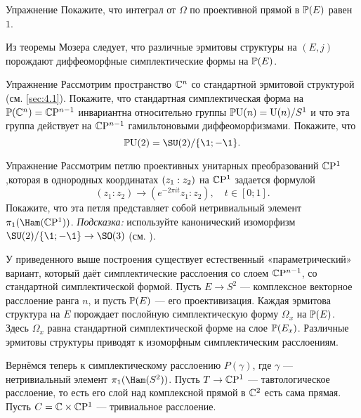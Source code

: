 \begin{ex}{Упражнение}\label{9.2.A}
  Покажите, что интеграл от $\Omega$ по проективной прямой в $\mathbb{P}(E)$
  равен $1$.
\end{ex}

Из теоремы Мозера \cite{MS} следует, что различные эрмитовы структуры
на $(E, j)$ порождают диффеоморфные симплектические формы на
$\mathbb{P}(E)$. 

\begin{ex}{Упражнение}\label{9.2.B}
  Рассмотрим пространство $\mathbb{C}^n$ со стандартной эрмитовой структурой
  (см. \ref{sec:4.1}).
  Покажите, что стандартная симплектическая форма на $\mathbb{P}(\mathbb{C}^n ) =
  \mathbb{C}\mathrm{P}^{n-1}$ инвариантна относительно группы $\mathbb{P}\mathrm{U} (n) = \mathrm{U} (n)/S^1$ и
  что эта группа действует на $\mathbb{C}\mathrm{P}^{n-1}$ гамильтоновыми
  диффеоморфизмами.
  Покажите, что 
  \[\PU (2) = \SU (2)/\{\1; -\1\}.\]
\end{ex}
 
\begin{ex}{Упражнение}\label{9.2.C}
Рассмотрим петлю проективных унитарных преобразований $\mathbb{C}\mathrm{P}^1$,которая в однородных координатах $(z_1 \z: z_2)$ на $\mathbb{C}\mathrm{P}^1$ задается формулой
\[(z_1 : z_2 ) \to (e^{-2\pi it} z_1 : z_2 ),\quad t \in [0; 1].\]
Покажите, что эта петля представляет собой нетривиальный элемент $\pi_1 (\Ham(\CP^1 ))$.
\emph{Подсказка:} используйте канонический изоморфизм $\SU (2)/\{\1; -\1\}\to \SO(3)$ (см. \cite{DFN}).  
\end{ex}

У приведенного выше построения существует естественный
«параметрический» вариант, который даёт симплектические расслоения со
слоем $\mathbb{C}\mathrm{P}^{n-1}$, со стандартной симплектической формой. 
Пусть $E \to S^2$ --- комплексное векторное расслоение ранга $n$, и
пусть $\mathbb{P}(E)$ --- его проективизация. 
Каждая эрмитова структура на $E$ порождает послойную симплектическую
форму $\Omega_x$ на $\mathbb{P}(E)$. 
Здесь $\Omega_x$ равна стандартной симплектической форме на слое
$\mathbb{P}(E_x)$.
Различные эрмитовы структуры приводят к изоморфным симплектическим
расслоениям. 

Вернёмся теперь к симплектическому расслоению $P(\gamma)$, где
$\gamma$ --- нетривиальный элемент $\pi_1 (\Ham(S^2 ))$. 
Пусть $T \to \mathbb{C}\mathrm{P}^1$ --- тавтологическое расслоение,
то есть его слой над комплексной прямой в $\mathbb{C}^2$ есть сама прямая. 
Пусть $C = \mathbb{C} \times \mathbb{C}\mathrm{P}^1$ --- тривиальное расслоение.
 
